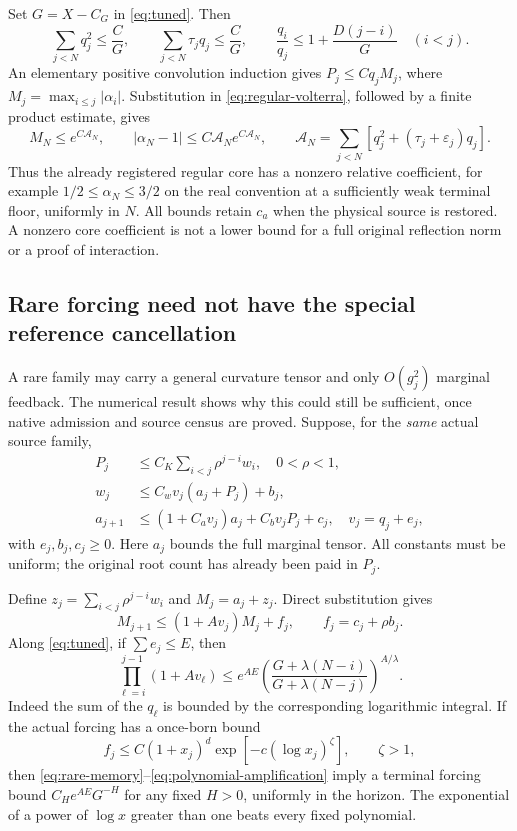 Set $G=X-C_G$ in \eqref{eq:tuned}. Then
\[
 \sum_{j<N}q_j^2\le\frac{C}{G},\qquad
 \sum_{j<N}\tau_jq_j\le\frac{C}{G},\qquad
 \frac{q_i}{q_j}\le1+\frac{D(j-i)}G\quad(i<j).
\]
An elementary positive convolution induction gives $P_j\le Cq_jM_j$, where $M_j=\max_{i\le j}|\alpha_i|$. Substitution in \eqref{eq:regular-volterra}, followed by a finite product estimate, gives
\[
 M_N\le e^{C\mathcal A_N},\qquad
 |\alpha_N-1|\le C\mathcal A_Ne^{C\mathcal A_N},\qquad
 \mathcal A_N=\sum_{j<N}[q_j^2+(\tau_j+\varepsilon_j)q_j].
\]
Thus the already registered regular core has a nonzero relative coefficient, for example $1/2\le\alpha_N\le3/2$ on the real convention at a sufficiently weak terminal floor, uniformly in $N$. All bounds retain $c_a$ when the physical source is restored. A nonzero core coefficient is not a lower bound for a full original reflection norm or a proof of interaction.

\subsection{Rare forcing need not have the special reference cancellation}

A rare family may carry a general curvature tensor and only $O(g_j^2)$ marginal feedback. The numerical result  shows why this could still be sufficient, once native admission and source census are proved. Suppose, for the \emph{same} actual source family,
\begin{align}\label{eq:rare-recursion}
 P_j&\le C_K\sum_{i<j}\rho^{j-i}w_i,\quad0<\rho<1,\nonumber\\
 w_j&\le C_wv_j(a_j+P_j)+b_j,\\
 a_{j+1}&\le(1+C_av_j)a_j+C_bv_jP_j+c_j,
 \quad v_j=q_j+e_j,\nonumber
\end{align}
with $e_j,b_j,c_j\ge0$. Here $a_j$ bounds the full marginal tensor. All constants must be uniform; the original root count has already been paid in $P_j$.

Define $z_j=\sum_{i<j}\rho^{j-i}w_i$ and $M_j=a_j+z_j$. Direct substitution gives
\begin{equation}\label{eq:rare-memory}
 M_{j+1}\le(1+Av_j)M_j+f_j,\qquad f_j=c_j+\rho b_j.
\end{equation}
Along \eqref{eq:tuned}, if $\sum e_j\le E$, then
\begin{equation}\label{eq:polynomial-amplification}
 \prod_{\ell=i}^{j-1}(1+Av_\ell)
 \le e^{AE}\left(
 \frac{G+\lambda(N-i)}{G+\lambda(N-j)}\right)^{A/\lambda}.
\end{equation}
Indeed the sum of the $q_\ell$ is bounded by the corresponding logarithmic integral. If the actual forcing has a once-born bound
\[
 f_j\le C(1+x_j)^d\exp[-c(\log x_j)^\zeta],\qquad\zeta>1,
\]
then \eqref{eq:rare-memory}--\eqref{eq:polynomial-amplification} imply a terminal forcing bound $C_H e^{AE}G^{-H}$ for any fixed $H>0$, uniformly in the horizon. The exponential of a power of $\log x$ greater than one beats every fixed polynomial.

